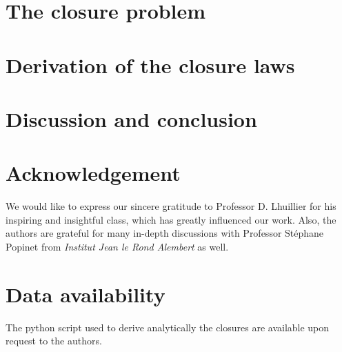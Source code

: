 \documentclass[11pt]{My_preprint}
\begin{document}
\section{The closure problem}
\label{ap:Closure_problem}


\section{Derivation of the closure laws}
\label{sec:application}


\section{Discussion and conclusion}
%


\section*{Acknowledgement}
We would like to express our sincere gratitude to Professor D. Lhuillier for his inspiring and insightful class, which has greatly influenced our work.
Also, the authors are grateful for many in-depth discussions with Professor St\'ephane Popinet from \textit{Institut Jean le Rond Alembert} as well. 

\section*{Data availability}

The python script used to derive analytically the closures are available upon request to the authors. 


\appendix

%
%
% 

%


\end{document}

